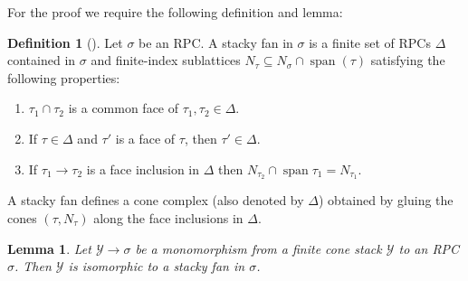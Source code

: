 \documentclass[11pt]{amsart}
\newtheorem{lemma}[theorem]{Lemma}
\theoremstyle{definition}
\newtheorem{definition}[theorem]{Definition}
\theoremstyle{remark}
\DeclareMathOperator{\Span}{span}
\begin{document}
For the proof we require the following definition and lemma:

\begin{definition}[{\cite[Definition 2.2.3]{ATheoryOfStaGillam2015}}]
	Let $\sigma$ be an RPC. A stacky fan in $\sigma$
	is a finite set of RPCs $\Delta$ contained in $\sigma$ and finite-index
	sublattices $N_{\tau}\subseteq N_{\sigma}\cap \Span(\tau)$ satisfying the following properties:
	\begin{enumerate}
		\item $\tau_1\cap \tau_2$ is a common face of $\tau_1,\tau_2\in \Delta$.
		\item If $\tau\in \Delta$ and $\tau'$ is a face of $\tau$, then $\tau'\in \Delta$.
		\item If $\tau_1\to \tau_2$ is a face inclusion in $\Delta$ then $N_{\tau_2}\cap \Span \tau_1=N_{\tau_1}$.
	\end{enumerate}
	A stacky fan defines a cone complex (also denoted by $\Delta$)
	obtained by gluing the cones $(\tau,N_{\tau})$ along the face inclusions in $\Delta$.
\end{definition}

\begin{lemma}
	\label{lem:mono_impl_fan}
	Let $\mathcal{Y}\to \sigma$ be a monomorphism from a finite cone stack $\mathcal{Y}$ to an RPC $\sigma$. Then $\mathcal{Y}$
	is isomorphic to a stacky fan in $\sigma$.
\end{lemma}
\end{document}
